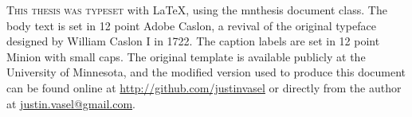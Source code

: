 %
%
%
%

\begin{minipage}{0.7\textwidth}
	\onehalfspacing
	\minion
	\large
	\raggedright\lettrine[lines=2,slope=-2pt,nindent=-4pt]{\textcolor{BrickRed}T}{his thesis was typeset} with \LaTeX, using the mnthesis document class. The body text is set in 12 point Adobe Caslon, a revival of the original typeface designed by William Caslon I in 1722. The caption labels are set in 12 point Minion with small caps. The original template is available publicly at the University of Minnesota, and the modified version used to produce this document can be found online at \href{http://github.com/justinvasel/}{http://github.com/justinvasel} or directly from the author at \href{mailto:justin.vasel@gmail.com}{justin.vasel@gmail.com}.
	\normalsize
	\normalfont
\end{minipage}

